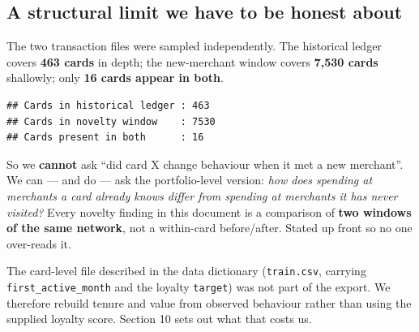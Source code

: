 \documentclass[
]{article}
\newenvironment{Shaded}{\begin{snugshade}}{\end{snugshade}}
\newcommand{\FunctionTok}[1]{\textcolor[rgb]{0.13,0.29,0.53}{\textbf{#1}}}
\newcommand{\NormalTok}[1]{#1}
\newcommand{\SpecialCharTok}[1]{\textcolor[rgb]{0.81,0.36,0.00}{\textbf{#1}}}
\newcommand{\StringTok}[1]{\textcolor[rgb]{0.31,0.60,0.02}{#1}}
\begin{document}
\subsection{A structural limit we have to be honest
about}\label{a-structural-limit-we-have-to-be-honest-about}

The two transaction files were sampled independently. The historical
ledger covers \textbf{463 cards} in depth; the new-merchant window
covers \textbf{7,530 cards} shallowly; only \textbf{16 cards appear in
both}.

\begin{Shaded}
\end{Shaded}

\begin{verbatim}
## Cards in historical ledger : 463 
## Cards in novelty window    : 7530 
## Cards present in both      : 16
\end{verbatim}

So we \textbf{cannot} ask ``did card X change behaviour when it met a
new merchant''. We can --- and do --- ask the portfolio-level version:
\emph{how does spending at merchants a card already knows differ from
spending at merchants it has never visited?} Every novelty finding in
this document is a comparison of \textbf{two windows of the same
network}, not a within-card before/after. Stated up front so no one
over-reads it.

The card-level file described in the data dictionary
(\texttt{train.csv}, carrying \texttt{first\_active\_month} and the
loyalty \texttt{target}) was not part of the export. We therefore
rebuild tenure and value from observed behaviour rather than using the
supplied loyalty score. Section 10 sets out what that costs us.
\end{document}
